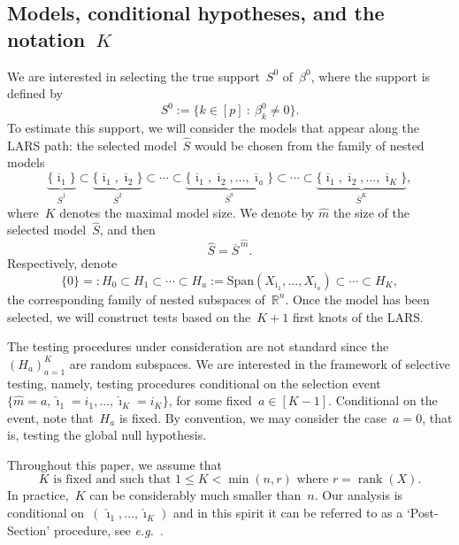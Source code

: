 \documentclass[final,numbib]{imaiai}%
\numberwithin{equation}{section}
\def\eq{\begin{equation}}
\def\qe{\end{equation}}
\DeclareMathOperator{\rank}{rank}
\renewcommand{\bar}{\overline}
\renewcommand{\hat}{\widehat}
\newcommand{\<}{\langle}
\renewcommand{\>}{\rangle}
\newcommand{\1}{\mathds{1}}
\begin{document}
{\subsection{Models, conditional hypotheses, and the notation~$K$}
\label{sec:hypotheses}
We are interested in selecting the true support~$S^0$ of~$\beta^0$, where the support is defined by
\[
S^0:=\big\{k\in[p]\ :\ \beta^0_k\neq0\big\}.
\]
To estimate this support, we will consider the models that appear along the LARS path: the selected model~$\hat S$ would be chosen from the family of nested models
\eq
\label{eq:sequence_supports}
\underbrace{\{\bar \imath_1\}}
_{\bar S^{1}}
\subset
\underbrace{\{\bar  \imath_1,\bar  \imath_2\}}
_{\bar S^{2}}
\subset\cdots\subset
\underbrace{\{\bar  \imath_1,\bar  \imath_2,\ldots,\bar \imath_a\}}
_{\bar S^{a}}
\subset\cdots\subset
\underbrace{\{\bar  \imath_1,\bar  \imath_2,\ldots,\bar  \imath_K\}}
_{\bar S^{K}},
\qe
where~$K$ denotes the maximal model size.
We denote by $\hat m$ the size of the selected model~$\hat S$, and then
\eq
\label{eq:size_model}
\hat S=\bar S ^{\,\hat m}.
\qe
Respectively, denote
\eq
\label{eq:sequence_subspaces}
\{0\}=:H_0\subset
H_1\subset \cdots \subset H_a:=\mathrm{Span}(X_{\bar \imath_1},\ldots,X_{\bar \imath_a})\subset \cdots \subset H_K,
\qe
the corresponding family of nested subspaces of~$\mathds R^n$.
Once the model has been selected, we will construct tests based on the~$K+1$ first knots of the LARS.


\begin{remark}
\label{rem:selective_testing}
The testing procedures under consideration are not standard since the~$(H_{a})_{a=1}^{K}$ are random subspaces.
We are interested in the framework of selective testing, namely, testing procedures conditional on the selection event~$\{\hat m=a,\hat \imath_1 =i_1, \ldots, \hat \imath_{K}=i_{K}\}$, for some fixed~$a\in[K-1]$.
Conditional on the event, note that~$H_{a}$ is fixed.
By convention, we may consider the case~$a=0$, that is, testing the global null hypothesis.
\end{remark}

\newpage

\noindent
Throughout this paper, we assume that~
\eq
\label{e:K}
K\text{ is fixed and such that }1\leq K <\min(n,r)\text{ where }r=\rank(X).
\qe
In practice,~$K$ can be considerably much smaller than~$n$.
Our analysis is conditional on~$(\,\hat \imath_1,\ldots,\hat \imath_{K})$ and in this spirit it can be referred to as a `Post-Section' procedure, see {\it e.g.}~\cite{taylor2015statistical,taylor2014exact,hastie2015statistical}.

}
\end{document}
